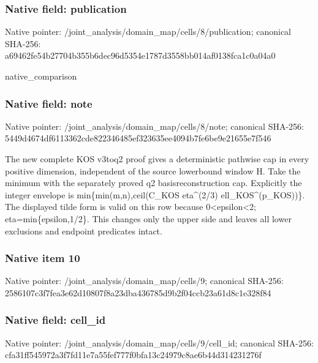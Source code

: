 \documentclass[10pt,a4paper]{article}
\begin{document}
\subsubsection{Native field: publication}


Native pointer: /joint\_analysis/domain\_m\allowbreak{}ap/cells/8/publication; canonical SHA-256: a69462fe54b27704b355b6de\allowbreak{}c96d5354e1787d3558bb014a\allowbreak{}f0138fca1c0a04a0


native\_comparison


\subsubsection{Native field: note}


Native pointer: /joint\_analysis/domain\_map/cells/8/note; canonical SHA-256: 5449d4674df6113362cde822\allowbreak{}346485ef323635ee4094b7fe\allowbreak{}6be9e21655e7f546


The new complete KOS v3toq2 proof gives a deterministic pathwise cap in every positive dimension, independent of the source lowerbound window H. Take the minimum with the separately proved q2 basisreconstruction cap. Explicitly the integer envelope is min\{min(m,n),ceil(C\_KOS eta\textasciicircum{}(2/3) ell\_KOS\textasciicircum{}(p\_KOS))\}. The displayed tilde form is valid on this row because 0<epsilon<2; eta=min\{epsilon,1/2\}. This changes only the upper side and leaves all lower exclusions and endpoint predicates intact.


\subsubsection{Native item 10}


Native pointer: /joint\_analysis/domain\_map/cells/9; canonical SHA-256: 2586107c3f7fea3e62d10807\allowbreak{}f8a23dba436785d9b2f04ccb\allowbreak{}23a61d8c1e328f84



\subsubsection{Native field: cell\_id}


Native pointer: /joint\_analysis/domain\_m\allowbreak{}ap/cells/9/cell\_id; canonical SHA-256: cfa31ff545972a3f7fd11e7a\allowbreak{}55fef777f0bfa13c24979c8a\allowbreak{}e6b44d314231276f
\end{document}
